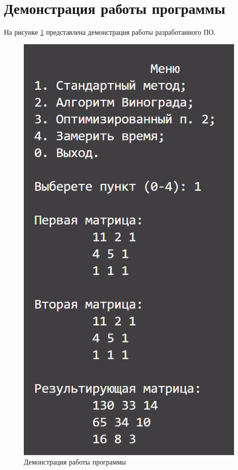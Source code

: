 \section{Демонстрация работы программы}
На рисунке \ref{img:demonstration} представлена демонстрация работы разработанного ПО.  
\begin{figure}[h]
	\centering
	\includegraphics[height=0.3\textheight]{img/prog_work.png}
	\caption{Демонстрация работы программы}
	\label{img:demonstration}
\end{figure}

